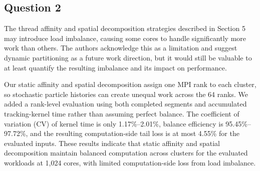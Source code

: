 \subsection{Question 2}
\begin{reviewcomment}
The thread affinity and spatial decomposition strategies described in Section 5 may introduce load imbalance, causing some cores to handle significantly more work than others. The authors acknowledge this as a limitation and suggest dynamic partitioning as a future work direction, but it would still be valuable to at least quantify the resulting imbalance and its impact on performance.
\end{reviewcomment}

Our static affinity and spatial decomposition assign one MPI rank to each cluster, so stochastic particle histories can create unequal work across the 64 ranks. We added a rank-level evaluation using both completed segments and accumulated tracking-kernel time rather than assuming perfect balance. The coefficient of variation (CV) of kernel time is only 1.17\%--2.01\%, balance efficiency is 95.45\%--97.72\%, and the resulting computation-side tail loss is at most 4.55\% for the evaluated inputs. These results indicate that static affinity and spatial decomposition maintain balanced computation across clusters for the evaluated workloads at 1,024 cores, with limited computation-side loss from load imbalance.


